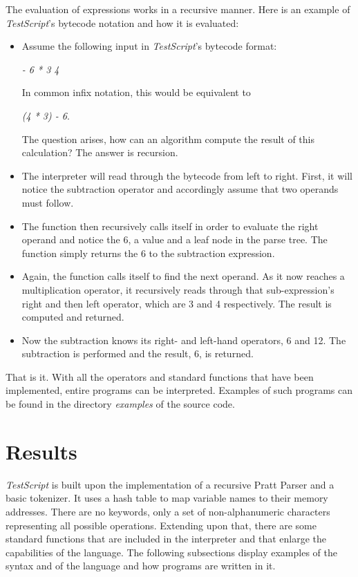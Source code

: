 \documentclass[12pt,a4paper]{article}
\newcommand{\expr}[1] {
    \begin{center}
        #1
    \end{center}
}
\newcommand{\name}{\emph{TestScript}}
\begin{document}
The evaluation of expressions works in a recursive manner. Here is an 
example of \name{}'s bytecode notation and how it is evaluated:
\begin{itemize}
    \item Assume the following input in \name{}'s bytecode format: 
        \expr{\emph{- 6 * 3 4}}
        In common infix notation, this would be equivalent to 
        \expr{\emph{(4 * 3) - 6}.}
        The question arises, how can an algorithm compute the result of this
        calculation? The answer is recursion.
    \item The interpreter will read through the bytecode from left to right. First, it will
        notice the subtraction operator and accordingly assume that two
        operands must follow.
    \item The function then recursively calls itself in order to evaluate the
        right operand and notice the 6, a value and a leaf node in the parse tree. 
        The function simply returns the 6 to the subtraction expression.
    \item Again, the function calls itself to find the next operand.
        As it now reaches a multiplication operator,
        it recursively reads through that sub-expression's right and then left
        operator, which are 3 and 4 respectively.
        The result is computed and returned.
    \item Now the subtraction knows its right- and left-hand operators, 6 and 12.
        The subtraction is performed and the result, 6, is returned.
\end{itemize}

That is it. With all the operators and standard functions that have been implemented, entire programs
can be interpreted. Examples of such programs can be found in the directory
\emph{examples} of the source code.

\section{Results}

\name{} is built upon the implementation of a recursive Pratt Parser
and a basic tokenizer. It uses a hash table to map variable names to their
memory addresses. There are no keywords, only a set of non-alphanumeric characters
representing all possible operations. Extending upon that, there are some
standard functions that are included in the interpreter and that enlarge the capabilities of the language.
The following subsections display examples of the syntax and of the language and
how programs are written in it.
\end{document}
